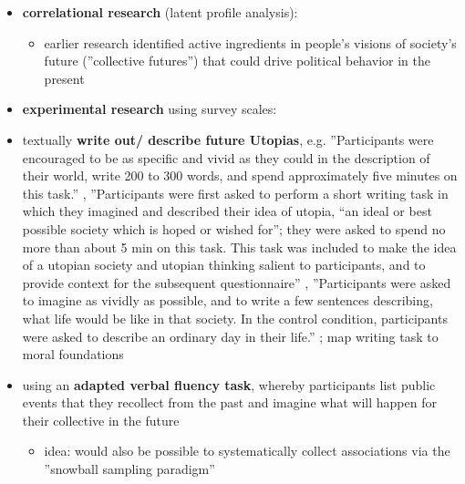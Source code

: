 \documentclass[jou,floatsintext]{apa7}
\begin{document}
\begin{itemize}
    \item \textbf{correlational research} (latent profile analysis): \cite{fernandoProfilesIdealSociety2023, lizzio-wilsonWhatCouldBe2025}
    \begin{itemize}
        \item earlier research identified active ingredients in people’s visions of society’s future (''collective futures'') that could drive political behavior in the present \parencite{bainPromotingProenvironmentalAction2012a, bainCollectiveFuturesHow2013}
    \end{itemize}
    \item \textbf{experimental research} using survey scales: \cite{fernandoFunctionsUtopiaHow2018, fernandoGreensSpaceInvaders2020, panayiotouImpossibleWorldsSocial2020, prescottThinkingEcologicalUtopia2025}
    \item textually \textbf{write out/ describe future Utopias}, e.g. ''Participants were encouraged to be as specific  and vivid as they could in the description of their world, write 200 to 300 words, and spend  approximately five minutes on this task.'' \parencite[p. 40 in][]{panayiotouImpossibleWorldsSocial2020}, ''Participants were first asked to perform a short writing task in which they imagined and described their idea of utopia, “an ideal or best possible society which is hoped or wished for”; they were asked to spend no more than about 5 min on this task. This task was included to make the idea of a utopian society and utopian thinking salient to participants, and to provide context for the subsequent questionnaire'' \parencite[p. 782 in][]{fernandoFunctionsUtopiaHow2018}, ''Participants were asked to imagine as vividly as possible, and to  write a few sentences describing, what life would be like in that society.  In the control condition, participants were asked to describe an ordinary day in their life.'' \parencite[p. 282 in][]{fernandoGreensSpaceInvaders2020}; map writing task to moral foundations \parencite[see][]{panayiotouImpossibleWorldsSocial2020}
    \item using an \textbf{adapted verbal fluency task}, whereby participants list public events that they recollect from the past and imagine what will happen for their collective in the future \parencite[p. 13ff. in][]{kashimaCollectiveFutureThinking2025}
    \begin{itemize}
        \item idea: would also be possible to systematically collect associations via the ''snowball sampling paradigm'' \parencite[see][]{aeschbachMappingMentalRepresentations, wulffSemanticRepresentationRisk2022}
    \end{itemize}
\end{itemize}
\end{document}
